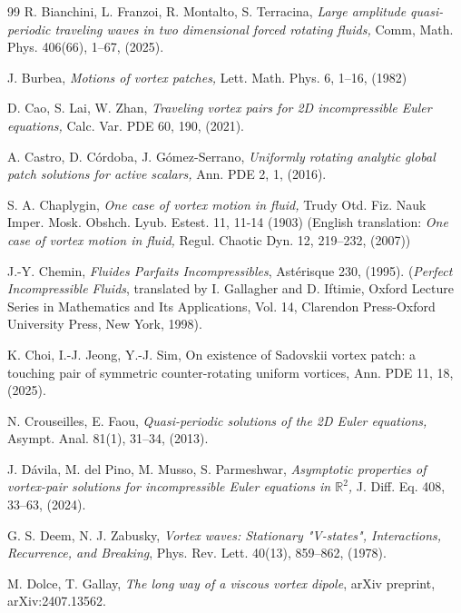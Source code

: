\documentclass[a4paper,reqno,10pt]{article}
\begin{document}
\begin{thebibliography}{99}
       R. Bianchini, L. Franzoi, R. Montalto, S. Terracina, 
       \textit{Large amplitude quasi-periodic traveling waves in two dimensional forced rotating fluids,} 
       Comm,  Math. Phys. 406(66), 1--67, (2025).



    J. Burbea, 
    \textit{Motions of vortex patches,}
    Lett. Math. Phys. 6, 1--16, (1982)
    
  D. Cao, S. Lai, W. Zhan,
\textit{Traveling vortex pairs for 2D incompressible Euler equations,} 
Calc. Var. PDE 60, 190, (2021).


A. Castro, D. C\'ordoba, J. G\'omez-Serrano, 
\textit{Uniformly rotating analytic global patch solutions for active scalars,} 
Ann. PDE 2,  1, (2016).



    S. A. Chaplygin, 
    \textit{One case of vortex motion in fluid,}
    Trudy Otd. Fiz. Nauk Imper. Mosk. Obshch. Lyub. Estest. 11, 11-14 (1903) (English translation: \textit{One case of vortex motion in fluid,}
Regul. Chaotic Dyn. 12, 219--232, (2007))

J.-Y. Chemin, 
\textit{Fluides Parfaits Incompressibles}, 
Ast\'erisque 230, (1995). 
(\textit{Perfect Incompressible Fluids},
translated by I. Gallagher and D. Iftimie, Oxford Lecture Series in Mathematics and Its Applications, Vol. 14, Clarendon Press-Oxford University Press, New York, 1998).

K. Choi, I.-J. Jeong, Y.-J. Sim, 
{On existence of Sadovskii vortex patch: a touching pair of symmetric counter-rotating uniform vortices,}
Ann. PDE 11, 18, (2025).

 N. Crouseilles, E. Faou, 
 \textit{Quasi-periodic solutions of the 2D Euler equations,} 
 Asympt. Anal. 81(1), 31--34, (2013).

J. D\'avila, M. del Pino, M. Musso, S. Parmeshwar, 
\textit{Asymptotic properties of vortex-pair solutions for incompressible Euler equations in $\mathbb{R}^2$,} 
J. Diff. Eq. 408, 33--63, (2024).

    G. S. Deem, N. J. Zabusky,
 {\it Vortex waves: Stationary "V-states", Interactions, Recurrence, and Breaking}, 
 Phys. Rev. Lett.  40(13), 859--862, (1978).

    M. Dolce, T. Gallay, 
    {\it The long way of a viscous vortex dipole},
    arXiv preprint, arXiv:2407.13562.
	

\end{thebibliography}
\end{document}
